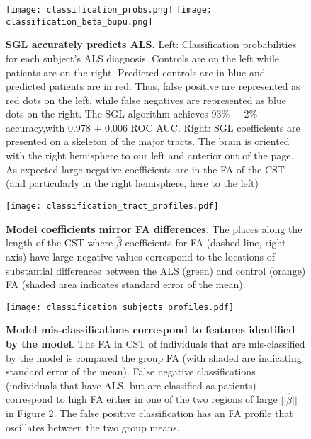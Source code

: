 \begin{figure}[h]
    \centering
    \texttt{[image: classification\_probs.png]}
    \texttt{[image: classification\_beta\_bupu.png]}

    \caption{{\bf SGL accurately predicts ALS.}
        Left: Classification probabilities for each subject's ALS diagnosis.
        Controls are on the left while patients are on the right. Predicted
        controls are in blue and predicted patients are in red. Thus, false
        positive are represented as red dots on the left, while false negatives
        are represented as blue dots on the right. The SGL algorithm achieves
        93\% $\pm$ 2\% accuracy,with 0.978 $\pm$ 0.006 ROC AUC. Right: SGL
        coefficients are presented on a skeleton of the major tracts. The brain
        is oriented with the right hemisphere to our left and anterior out of
        the page. As expected large negative coefficients are in the FA of the
        CST (and particularly in the right hemisphere, here to the left)}
    \label{fig:class-results}
\end{figure}

\begin{figure}[h]
    \centering
    \texttt{[image: classification\_tract\_profiles.pdf]}
    \caption{{\bf Model coefficients mirror FA differences}. The places along the
       length of the CST  where $\hat{\beta}$ coefficients for FA
       (dashed line, right axis) have large negative values correspond to the
       locations of substantial differences between the ALS (green) and control
       (orange) FA (shaded area indicates standard error of the mean).}
    \label{fig:class-profiles}
\end{figure}

\begin{figure}[h]
    \centering
        \texttt{[image: classification\_subjects\_profiles.pdf]}
    \caption{{\bf Model mis-classifications correspond to features identified by
       the model}. The FA in CST of individuals that are mis-classified by the
       model is compared the group FA (with shaded are indicating standard error
       of the mean). False negative classifications (individuals that have ALS,
       but are classified as patients) correspond to high FA either in one of
       the two regions of large $||\hat{\beta}||$ in
       Figure \ref{fig:class-profiles}. The false positive classification has
       an FA profile that oscillates between the two group means.
   }
    \label{fig:class-errors}
\end{figure}

